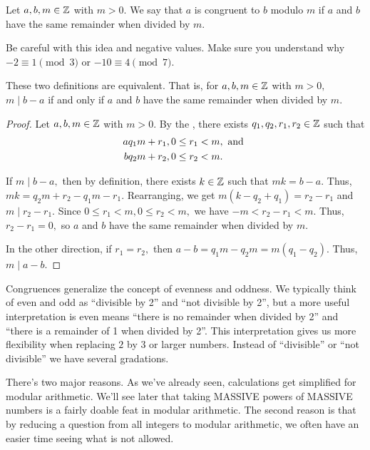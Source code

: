 \documentclass{../ximera}
\begin{document}
\begin{defn}\label{defn:mod-remainder} Let $a,b,m\in\mathbb Z$ with $m>0.$ We say that $a$ is congruent to $b$ modulo $m$ if $a$ and $b$ have the same remainder when divided by $m$. 
\end{defn}
Be careful with this idea and negative values. Make sure you understand why $-2\equiv 1\pmod{3}$ or $-10\equiv 4\pmod{7}$.

\begin{proposition}\label{prop:mod-defn:equiv}
These two definitions are equivalent. That is, for $a,b,m\in\mathbb Z$ with $m>0,$ $m\mid b-a$ if and only if $a$ and $b$ have the same remainder when divided by $m$.
\end{proposition}

\begin{proof}
Let $a,b,m\in\mathbb Z$ with $m> 0.$ By the , there exists $q_1,q_2,r_1,r_2\in\mathbb Z$ such that \begin{align*}
                    a & q_1 m +r_1, 0\leq r_1< m, \textnormal{ and }\\
                    b & q_2 m +r_2, 0\leq r_2< m.
                \end{align*}
            
            
                If $m\mid b-a,$ then by definition, there exists $k\in\mathbb Z$ such that $mk=b-a.$ Thus, $mk=q_2 m+r_2-q_1 m-r_1.$ Rearranging, we get 
                $m(k-q_2+q_1)=r_2-r_1$ and $m\mid r_2-r_1.$ Since 
                $0\leq r_1< m, 0\leq r_2< m,$ we have 
                $-m< r_2-r_1< m.$ Thus, $r_2-r_1=0,$ so $a$ and $b$ have the same remainder when divided by $m$.
            

            
                In the other direction, if $r_1=r_2,$ then $a-b=q_1 m-q_2 m=m(q_1-q_2).$ Thus, $m\mid a-b.$
\end{proof}

Congruences generalize the concept of evenness and oddness. We typically think of even and odd as ``divisible by 2'' and ``not divisible by 2'', but a more useful interpretation is even means ``there is no remainder when divided by 2'' and ``there is a remainder of 1 when divided by 2''. This interpretation gives us more flexibility when replacing $2$ by $3$ or larger numbers. Instead of ``divisible'' or ``not divisible'' we have several gradations.

There's two major reasons. As we've already seen, calculations get simplified for modular arithmetic. We'll see later that taking MASSIVE powers of MASSIVE numbers is a fairly doable feat in modular arithmetic. The second reason is that by reducing a question from all integers to modular arithmetic, we often have an easier time seeing what is not allowed. 
\end{document}
